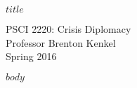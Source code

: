 \documentclass[12pt,svgnames]{article}
\begin{document}
{\Huge \textsf{\textbf{$title$}}}

\textsf{%
  PSCI 2220: Crisis Diplomacy \\
  Professor Brenton Kenkel \\
  Spring 2016
}

\bigskip

$body$
\end{document}
